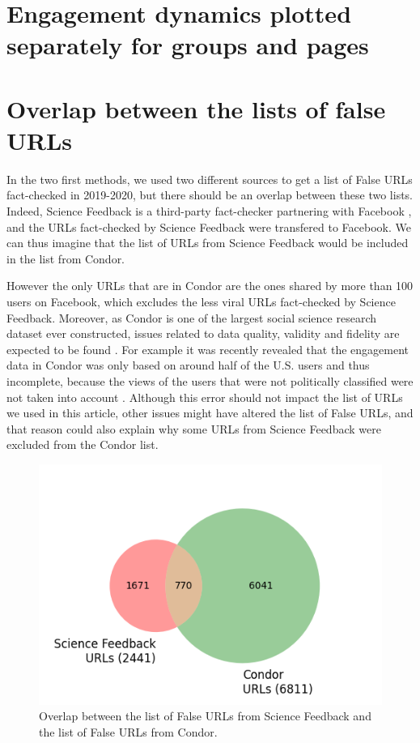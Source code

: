 \documentclass[review]{elsarticle}
\begin{document}
{\section*{Engagement dynamics plotted separately for groups and pages}


\section*{Overlap between the lists of false URLs}

In the two first methods, we used two different sources to get a list of False URLs fact-checked in 2019-2020, but there should be an overlap between these two lists. 
Indeed, Science Feedback is a third-party fact-checker partnering with Facebook \citep{sciencefeedbackFbPartner}, and the URLs fact-checked by Science Feedback were transfered to Facebook.
We can thus imagine that the list of URLs from Science Feedback would be included in the list from Condor.

However the only URLs that are in Condor are the ones shared by more than 100 users on Facebook, which excludes the less viral URLs fact-checked by Science Feedback.
Moreover, as Condor is one of the largest social science research dataset ever constructed, issues related to data quality, validity and fidelity are expected to be found \cite{messing2020facebook}.
For example it was recently revealed that the engagement data in Condor was only based on around half of the U.S. users and thus incomplete, because the views of the users that were not politically classified were not taken into account \citep{NYTrevelations}. 
Although this error should not impact the list of URLs we used in this article, other issues might have altered the list of False URLs, and that reason could also explain why some URLs from Science Feedback were excluded from the Condor list.

\begin{figure}[!h]
\centering
\includegraphics[scale=0.5]{./../figure/supplementary_venn_urls.png}
\caption{
Overlap between the list of False URLs from Science Feedback and the list of False URLs from Condor.
}
\label{venn_urls}
\end{figure}

}
\end{document}
